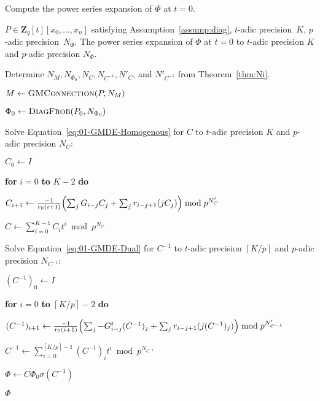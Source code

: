 \documentclass[a4paper,11pt]{article}
\numberwithin{equation}{section}
\providecommand{\ceil}[1]{\left\lceil#1\right\rceil}   %
\newcommand{\ZZ}{\mathbf{Z}} %
\theoremstyle{definition}
\begin{document}
\begin{algorithm}
\caption{Compute the power series expansion of $\Phi$ at $t=0$.}
\label{alg:expansion}
\begin{algorithmic}
\vspace{1mm}
\Require $P \in \ZZ_q[t][x_0,\dotsc,x_n]$ satisfying Assumption~\ref{assump:diag}, $t$-adic precision~$K$, $p$-adic precision~$N_{\Phi}$.
\Ensure  The power series expansion of $\Phi$ at $t=0$ to $t$-adic precision $K$ and $p$-adic precision $N_{\Phi}$.
\State \begin{compactenum}[{\hspace{6pt}} 1.] \vspace{-1.24em}
\item Determine $N_M,N_{\Phi_0},N_C,N_{C^{-1}},N'_C$, and $N'_{C^{-1}}$ from Theorem~\ref{thm:Ni}.
\item $M \gets \textsc{GMConnection}(P,N_M)$
\item $\Phi_0 \gets \textsc{DiagFrob}(P_0,N_{\Phi_0})$
\item Solve Equation~\eqref{eq:01-GMDE-Homogenous} for $C$ to $t$-adic precision $K$ and $p$-adic precision $N_{C}$:
\begin{compactenum}[a.] 
\item[] $C_0 \gets I$
\item[] \textbf{for} $i=0$ \textbf{to} $K-2$ \textbf{do} 
\item[] \hspace{0.6em} $C_{i+1} \gets \frac{-1}{r_0 (i+1)} \Bigl(\sum_j G_{i-j} C_j + \sum_j r_{i-j+1} (j C_j) \Bigr) \bmod{p^{N'_C}}$
\item[] $C \gets \sum_{i=0}^{K-1} C_i t^i \bmod{p^{N_C}}$
\end{compactenum}
\item Solve Equation~\eqref{eq:01-GMDE-Dual} for $C^{-1}$ to $t$-adic precision $\ceil{K/p}$ and $p$-adic precision $N_{C^{-1}}$:
\begin{compactenum}[a.]
\item[] $(C^{-1})_0 \gets I$
\item[] \textbf{for} $i=0$ \textbf{to} $\ceil{K/p}-2$ \textbf{do}
\item[] \hspace{0.6em} $(C^{-1})_{i+1} \gets  \frac{-1}{r_0(i+1)} \Bigl(\sum_j -G_{i-j}^t (C^{-1})_j + \sum_j r_{i-j+1} (j (C^{-1})_j) \Bigr) \bmod{p^{N'_{C^{-1}}}}$
\item[] $C^{-1} \gets \sum_{i=0}^{\ceil{K/p}-1} (C^{-1})_i t^{i} \bmod{p^{N_{C^{-1}}}}$
\end{compactenum}
\item $\Phi \gets C \Phi_0 \sigma(C^{-1})$
\item \Return $\Phi$
\end{compactenum}
\EndProcedure
\end{algorithmic}
\end{algorithm}
\end{document}
